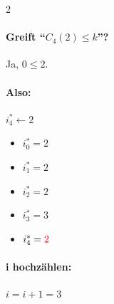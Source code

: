 \begin{multicols}{2}
    \paragraph{Greift ``$C_4(2)\le k$''?} Ja, $0 \le 2$.
    \paragraph{Also:} $i_4^\ast \gets 2$
    \columnbreak
    \begin{itemize}
        \item $i_0^\ast = 2$
        \item $i_1^\ast = 2 $
        \item $i_2^\ast = 2 $
        \item $i_3^\ast = 3$
        \item $i_4^\ast = \textcolor{red}{2}$
    \end{itemize}
\end{multicols}

\paragraph{i hochzählen:} $i = i + 1 = 3$

